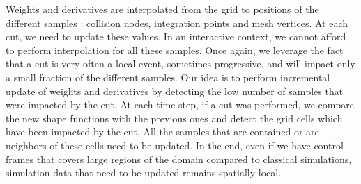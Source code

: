 \documentclass[11pt, oneside, a4paper]{memoir}
\begin{document}
Weights and derivatives are interpolated from the grid to positions of the different samples : collision nodes, integration points and mesh vertices. At each cut, we need to update these values. In an interactive context, we cannot afford to perform interpolation for all these samples. Once again, we leverage the fact that a cut is very often a local event, sometimes progressive, and will impact only a small fraction of the different samples. Our idea is to perform incremental update of weights and derivatives by detecting the low number of samples that were impacted by the cut. At each time step, if a cut was performed, we compare the new shape functions with the previous ones and detect the grid cells which have been impacted by the cut. All the samples that are contained or are neighbors of these cells need to be updated. In the end, even if we have control frames that covers large regions of the domain compared to classical simulations, simulation data that need to be updated remains spatially local.
\end{document}
